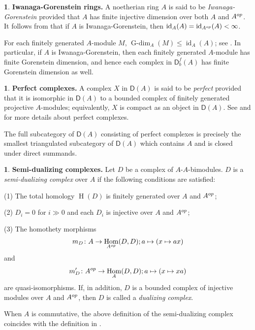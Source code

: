 \documentclass{amsart}
\DeclareMathOperator{\h}{H}
\newcommand{\D}{\mathsf{D}}
\newcommand{\0}{{\bf{0}}}
\DeclareMathOperator{\Gdim}{G-dim}
\DeclareMathOperator{\id}{id}
\DeclareMathOperator{\Hom}{Hom}
\theoremstyle{definition}
\newtheorem{chunk}[theorem]{}
\begin{document}
\begin{chunk}\label{def of I-Gorenstein}
\textbf{Iwanaga-Gorenstein rings.}
A noetherian ring $A$ is said to be \emph{Iwanaga-Gorenstein} provided that $A$ has finite injective dimension over both $A$ and $A^{\rm op}$. It follows from \cite[Lemma A]{Zaks} that if $A$ is Iwanaga-Gorenstein, then
$\id_A(A)=\id_{A^{\rm op}}(A)<\infty$. 

For each finitely generated $A$-module $M$, $\Gdim_A(M)\leq \id_A(A)$; see \cite[Corollary 2.21]{Hol}.
In particular, if $A$ is Iwanaga-Gorenstein, then each finitely generated $A$-module has finite Gorenstein dimension, and hence each complex in $\D^f_b(A)$ has finite Gorenstein dimension as well.
\end{chunk}


\begin{chunk}
\textbf{Perfect complexes.}  A complex $X$ in $\D(A)$ is said to be \emph{perfect} provided that it is isomorphic in $\D(A)$ to a bounded complex of finitely generated projective $A$-modules; equivalently, $X$ is compact as an object in $\D(A)$. See \cite[Chapter 1]{Buc} and \cite{Neeman} for more details about perfect complexes.

The full subcategory of $\D(A)$ consisting of perfect complexes is precisely the smallest triangulated subcategory of $\D(A)$ which contains $A$ and is closed under direct summands.
\end{chunk}
\begin{chunk}
\textbf{Semi-dualizing complexes.} Let $D$ be a complex of $A\mbox{-}A$-bimodules. $D$ is a \emph{semi-dualizing complex} over $A$ if the following conditions are satisfied:

(1) The total homology $\h(D)$ is finitely generated over $A$ and $A^{\rm op}$;

(2) $D_i=0$ for $i\gg 0$ and each $D_i$ is injective over $A$ and $A^{\rm op}$;

(3) The homothety morphisms
$$
{\rm m}_D\colon A\rightarrow \Hom_{A^{\rm op}}(D,D); a\mapsto (x\mapsto ax)
$$
and
$$
{\rm m}^\prime_D\colon A^{\rm {op}}\rightarrow \Hom_{A}(D,D); a\mapsto (x\mapsto xa)
$$
are quasi-isomorphisms. If, in addition, $D$ is a bounded complex of injective modules over $A$ and $A^{\rm op}$, then $D$ is called a \emph{dualizing complex}.

When $A$ is commutative, the above definition of the semi-dualizing complex coincides with the definition in \cite[Definition 2.1]{Chr01}.
\end{chunk}
\end{document}
